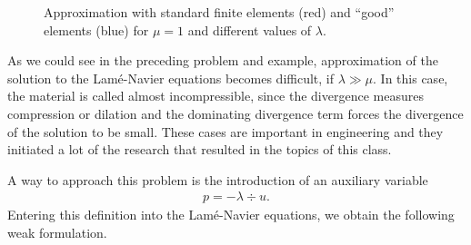 \begin{figure}[tp]
  \caption{Approximation with standard finite elements (red) and
    ``good'' elements (blue) for $\mu=1$ and different values of
    $\lambda$.}
  \label{fig:elasticity-compressibility}
\end{figure}

\begin{intro}
  As we could see in the preceding problem and example, approximation of the
  solution to the Lamé-Navier equations becomes difficult, if
  $\lambda \gg \mu$. In this case, the material is called almost
  incompressible, since the divergence measures compression or
  dilation and the dominating divergence term forces the divergence of
  the solution to be small. These cases are important in engineering
  and they initiated a lot of the research that resulted in the topics
  of this class.
\end{intro}

\begin{intro}
  A way to approach this problem is the introduction of an auxiliary variable
  \begin{gather*}
    p = -\lambda \div u.
  \end{gather*}
  Entering this definition into the Lamé-Navier equations, we obtain
  the following weak formulation.
\end{intro}

